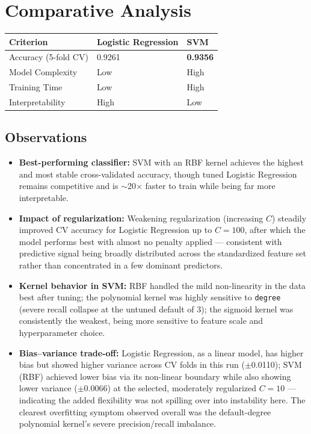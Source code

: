 \documentclass[11pt]{article}
\begin{document}
\section{Comparative Analysis}

\begin{center}
\begin{tabular}{lll}
\toprule
\textbf{Criterion} & \textbf{Logistic Regression} & \textbf{SVM} \\
\midrule
Accuracy (5-fold CV) & 0.9261 & \textbf{0.9356} \\
Model Complexity & Low & High \\
Training Time & Low & High \\
Interpretability & High & Low \\
\bottomrule
\end{tabular}
\end{center}

\subsection*{Observations}
\begin{itemize}[leftmargin=*]
  \item \textbf{Best-performing classifier:} SVM with an RBF kernel achieves the highest and most stable cross-validated accuracy, though tuned Logistic Regression remains competitive and is $\sim$20$\times$ faster to train while being far more interpretable.
  \item \textbf{Impact of regularization:} Weakening regularization (increasing $C$) steadily improved CV accuracy for Logistic Regression up to $C{=}100$, after which the model performs best with almost no penalty applied --- consistent with predictive signal being broadly distributed across the standardized feature set rather than concentrated in a few dominant predictors.
  \item \textbf{Kernel behavior in SVM:} RBF handled the mild non-linearity in the data best after tuning; the polynomial kernel was highly sensitive to \texttt{degree} (severe recall collapse at the untuned default of 3); the sigmoid kernel was consistently the weakest, being more sensitive to feature scale and hyperparameter choice.
  \item \textbf{Bias--variance trade-off:} Logistic Regression, as a linear model, has higher bias but showed higher variance across CV folds in this run ($\pm$0.0110); SVM (RBF) achieved lower bias via its non-linear boundary while also showing lower variance ($\pm$0.0066) at the selected, moderately regularized $C{=}10$ --- indicating the added flexibility was not spilling over into instability here. The clearest overfitting symptom observed overall was the default-degree polynomial kernel's severe precision/recall imbalance.
\end{itemize}
\end{document}
